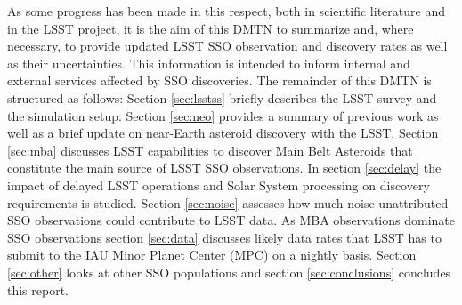As some progress has been made in this respect, both in scientific literature and in the \gls{LSST} project, it is the aim of this \gls{DMTN} to summarize and, where necessary, to provide updated \gls{LSST} \gls{SSO} observation and discovery rates as well as their uncertainties. This information is intended to inform internal and external services affected by \gls{SSO} discoveries.
The remainder of this \gls{DMTN} is structured as follows: Section \ref{sec:lsstss} briefly describes the \gls{LSST} survey and the simulation setup. Section \ref{sec:neo} provides a summary of previous work as well as a brief update on near-Earth asteroid discovery with the \gls{LSST}. Section \ref{sec:mba} discusses \gls{LSST} capabilities to discover Main Belt Asteroids that constitute the main source of \gls{LSST} \gls{SSO} observations. In section \ref{sec:delay} the impact of delayed \gls{LSST} operations and Solar System processing on discovery requirements is studied. Section \ref{sec:noise} assesses how much noise unattributed \gls{SSO} observations could contribute to \gls{LSST} data. As \gls{MBA} observations dominate \gls{SSO} observations section \ref{sec:data} discusses likely data rates that \gls{LSST} has to submit to the \gls{IAU} Minor Planet \gls{Center} (\gls{MPC}) on a nightly basis. Section \ref{sec:other}  looks at other \gls{SSO} populations and section \ref{sec:conclusions} concludes this report.

